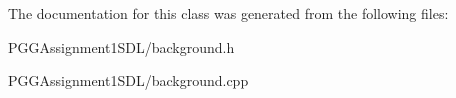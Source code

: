 The documentation for this class was generated from the following files\+:\begin{DoxyCompactItemize}
\item 
P\+G\+G\+Assignment1\+S\+D\+L/background.\+h\item 
P\+G\+G\+Assignment1\+S\+D\+L/background.\+cpp\end{DoxyCompactItemize}
